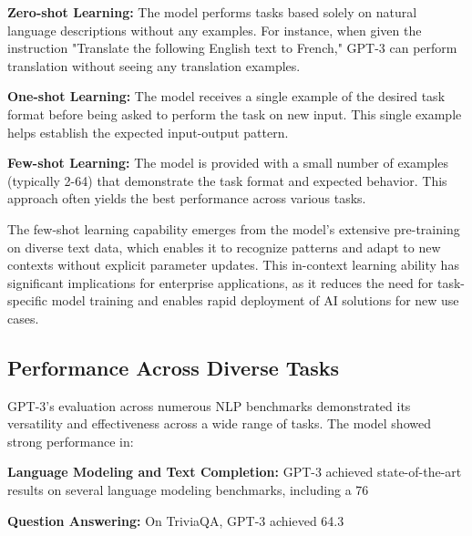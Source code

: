\textbf{Zero-shot Learning:} The model performs tasks based solely on natural language descriptions without any examples. For instance, when given the instruction "Translate the following English text to French," GPT-3 can perform translation without seeing any translation examples.

\textbf{One-shot Learning:} The model receives a single example of the desired task format before being asked to perform the task on new input. This single example helps establish the expected input-output pattern.

\textbf{Few-shot Learning:} The model is provided with a small number of examples (typically 2-64) that demonstrate the task format and expected behavior. This approach often yields the best performance across various tasks.


The few-shot learning capability emerges from the model's extensive pre-training on diverse text data, which enables it to recognize patterns and adapt to new contexts without explicit parameter updates. This in-context learning ability has significant implications for enterprise applications, as it reduces the need for task-specific model training and enables rapid deployment of AI solutions for new use cases.

\subsection{Performance Across Diverse Tasks}

GPT-3's evaluation across numerous NLP benchmarks demonstrated its versatility and effectiveness across a wide range of tasks. The model showed strong performance in:

\textbf{Language Modeling and Text Completion:} GPT-3 achieved state-of-the-art results on several language modeling benchmarks, including a 76%

\textbf{Question Answering:} On TriviaQA, GPT-3 achieved 64.3%

